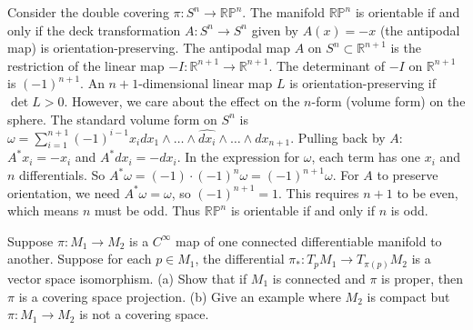 \begin{solution}
Consider the double covering $\pi: S^n \to \mathbb{RP}^n$. The manifold $\mathbb{RP}^n$ is orientable if and only if the deck transformation $A: S^n \to S^n$ given by $A(x) = -x$ (the antipodal map) is orientation-preserving.
The antipodal map $A$ on $S^n \subset \mathbb{R}^{n+1}$ is the restriction of the linear map $-I: \mathbb{R}^{n+1} \to \mathbb{R}^{n+1}$.
The determinant of $-I$ on $\mathbb{R}^{n+1}$ is $(-1)^{n+1}$.
An $n+1$-dimensional linear map $L$ is orientation-preserving if $\det L > 0$.
However, we care about the effect on the $n$-form (volume form) on the sphere.
The standard volume form on $S^n$ is $\omega = \sum_{i=1}^{n+1} (-1)^{i-1} x_i dx_1 \wedge \dots \wedge \widehat{dx_i} \wedge \dots \wedge dx_{n+1}$.
Pulling back by $A$: $A^* x_i = -x_i$ and $A^* dx_i = -dx_i$.
In the expression for $\omega$, each term has one $x_i$ and $n$ differentials.
So $A^* \omega = (-1) \cdot (-1)^n \omega = (-1)^{n+1} \omega$.
For $A$ to preserve orientation, we need $A^* \omega = \omega$, so $(-1)^{n+1} = 1$.
This requires $n+1$ to be even, which means $n$ must be odd.
Thus $\mathbb{RP}^n$ is orientable if and only if $n$ is odd.
\end{solution}

\begin{exercise}
\label{geometry:2010:4}
Suppose $\pi : M_{1} \to M_{2}$ is a $C^{\infty}$ map of one connected differentiable manifold to another. Suppose for each $p \in M_{1}$, the differential $\pi_{*} : T_{p} M_{1} \to T_{\pi(p)} M_{2}$ is a vector space isomorphism.
(a) Show that if $M_{1}$ is connected and $\pi$ is proper, then $\pi$ is a covering space projection.
(b) Give an example where $M_{2}$ is compact but $\pi : M_{1} \to M_{2}$ is not a covering space.
\end{exercise}

